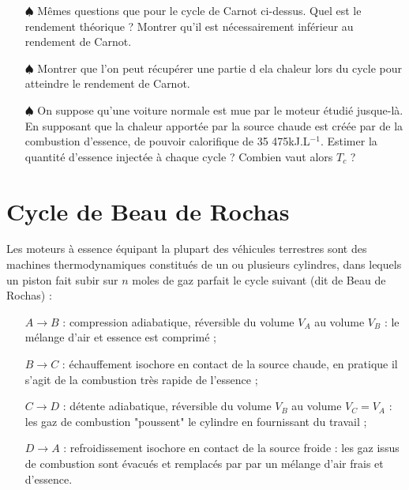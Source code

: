 \documentclass{report}
\begin{document}
\begin{itemize}

	\item[$\spadesuit$] Mêmes questions que pour le cycle de Carnot ci-dessus. Quel est le rendement théorique ? Montrer qu'il est nécessairement inférieur au rendement de Carnot.
	
	\item[$\spadesuit$]	 Montrer que l'on peut récupérer une partie d ela chaleur lors du cycle pour atteindre le rendement de Carnot.
	
	\item[$\spadesuit$] On suppose qu'une voiture normale est mue par le moteur étudié jusque-là. En supposant que la chaleur apportée par la source chaude est créée par de la combustion d'essence, de pouvoir calorifique de 35 475kJ.L$^{-1}$. Estimer la quantité d'essence injectée à chaque cycle ? Combien vaut alors $T_c$ ?
	
\end{itemize}

\newpage

\section*{Cycle de Beau de Rochas}

Les moteurs à essence équipant la plupart des véhicules terrestres sont des machines thermodynamiques constitués de un ou plusieurs cylindres, dans lequels un piston fait subir sur $n$ moles de gaz parfait le cycle suivant (dit de Beau de Rochas) :

\begin{itemize}

\item[$A \rightarrow B$ :] compression adiabatique, réversible du volume $V_A$ au volume $V_B$ : le mélange d'air et essence est comprimé ;
\item[$B \rightarrow C$ :] échauffement isochore en contact de la source chaude, en pratique il s'agit de la combustion très rapide de l'essence ;
\item[$C \rightarrow D$ :] détente adiabatique, réversible du volume $V_B$ au volume $V_C=V_A$ : les gaz de combustion "poussent" le cylindre en fournissant du travail ;
\item[$D \rightarrow A$ :] refroidissement isochore en contact de la source froide : les gaz issus de combustion sont évacués et remplacés par par un mélange d'air frais et d'essence.

\end{itemize}
\end{document}
